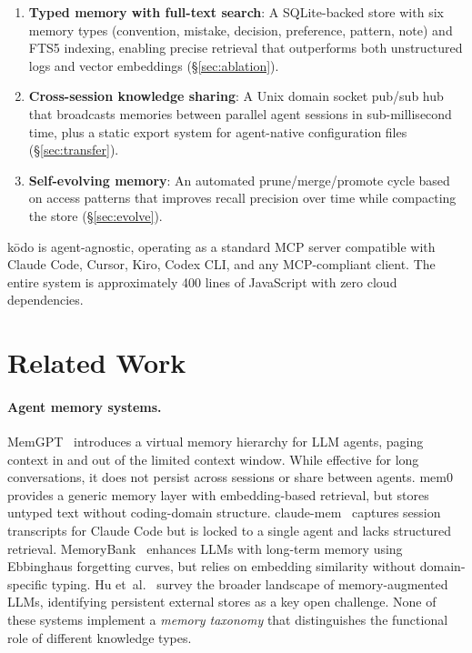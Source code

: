 \documentclass{article}
\begin{document}
\begin{enumerate}
    \item \textbf{Typed memory with full-text search}: A SQLite-backed store with six memory types (convention, mistake, decision, preference, pattern, note) and FTS5 indexing, enabling precise retrieval that outperforms both unstructured logs and vector embeddings (\S\ref{sec:ablation}).
    \item \textbf{Cross-session knowledge sharing}: A Unix domain socket pub/sub hub that broadcasts memories between parallel agent sessions in sub-millisecond time, plus a static export system for agent-native configuration files (\S\ref{sec:transfer}).
    \item \textbf{Self-evolving memory}: An automated prune/merge/promote cycle based on access patterns that improves recall precision over time while compacting the store (\S\ref{sec:evolve}).
\end{enumerate}

k\=odo is agent-agnostic, operating as a standard MCP server compatible with Claude Code, Cursor, Kiro, Codex CLI, and any MCP-compliant client. The entire system is approximately 400 lines of JavaScript with zero cloud dependencies.

\section{Related Work}

\paragraph{Agent memory systems.} MemGPT~\cite{packer2023memgpt} introduces a virtual memory hierarchy for LLM agents, paging context in and out of the limited context window. While effective for long conversations, it does not persist across sessions or share between agents. mem0~\cite{mem0} provides a generic memory layer with embedding-based retrieval, but stores untyped text without coding-domain structure. claude-mem~\cite{claudemem} captures session transcripts for Claude Code but is locked to a single agent and lacks structured retrieval. MemoryBank~\cite{zhong2024memorybank} enhances LLMs with long-term memory using Ebbinghaus forgetting curves, but relies on embedding similarity without domain-specific typing. Hu et~al.~\cite{hu2024memoryaugmented} survey the broader landscape of memory-augmented LLMs, identifying persistent external stores as a key open challenge. None of these systems implement a \emph{memory taxonomy} that distinguishes the functional role of different knowledge types.
\end{document}
